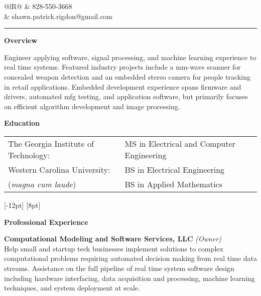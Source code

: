\documentclass[14pt,letterpaper]{extarticle}
\begin{document}
\pagestyle{empty}

\newcommand{\newsection}[1]{
\bigskip\medskip
\noindent\textbf{\large{#1}}
}


\noindent
\begin{tabularx}{\linewidth}{@{}lR@{}}
 & \footnotesize{828-550-3668} \\[-4pt]
& \footnotesize{shawn.patrick.rigdon@gmail.com} \\[-4pt]
\end{tabularx}

\smallskip
\noindent\rule[\baselineskip]{\linewidth}{1.5pt}


\noindent\textbf{\large{Overview}}

\medskip
\noindent\footnotesize{Engineer applying software, signal processing, and machine learning experience
to real time systems.  Featured industry projects include a mm-wave scanner for concealed weapon
detection and an embedded stereo camera for people tracking in retail applications.  Embedded development
experience spans firmware and drivers, automated mfg testing, and application software, but primarily
focuses on efficient algorithm development and image processing.}

\newsection{Education}

\medskip\noindent
\begin{tabular}{@{}ll@{}}
\footnotesize{The Georgia Institute of Technology:} & \footnotesize{MS in Electrical and Computer Engineering}\\[5pt]
\footnotesize{Western Carolina University:} & \footnotesize{BS in Electrical Engineering}\\
\footnotesize{(\textit{magna cum laude})} & \footnotesize{BS in Applied Mathematics}\\
\end{tabular}
[-12pt]
[8pt]

\newsection{Professional Experience}

\newcommand{\experience}[4]{
\medskip
\marginnote{\footnotesize{\textit{#1}}}
\noindent\footnotesize{\textbf{#2} \textit{(#3)}}\\
#4
}

\experience{2020}{Computational Modeling and Software Services, LLC}{Owner}{
Help small and startup tech businesses implement solutions to complex computational problems requiring
automated decision making from real time data streams.  Assistance on the full pipeline of real time
system software design including hardware interfacing, data acquisition and processing, machine learning
techniques, and system deployment at scale.
}
\end{document}
